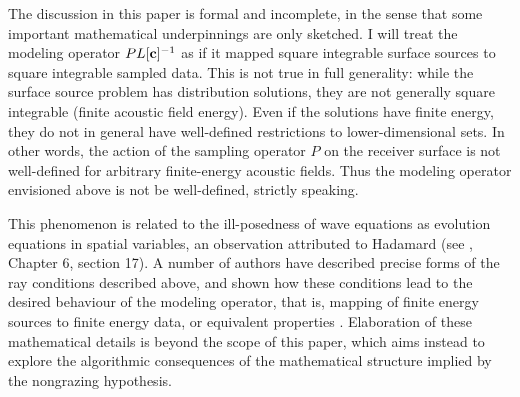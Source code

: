 \documentclass[georeport,12pt]{geophysics}
\begin{document}
The discussion in this paper is formal and incomplete, in the sense
that some important mathematical underpinnings are only
sketched. I will treat the modeling operator $PL[{\bf c}]^{-1}$ as if
it mapped square integrable surface sources to square integrable sampled
data. This is not true in full generality: while the surface source
problem has distribution solutions, they are not generally square
integrable (finite acoustic field energy). Even if the solutions have
finite energy, they do not in general have well-defined
restrictions to lower-dimensional sets. In other words, the action of
the sampling
operator $P$ on the receiver surface is not well-defined for arbitrary
finite-energy acoustic fields. Thus the modeling operator envisioned above
is not be well-defined, strictly speaking.

This phenomenon is related to the ill-posedness of wave equations as
evolution equations in spatial variables, an observation attributed to
Hadamard (see \cite{CourHil:62}, Chapter 6, section 17). A number of
authors have described precise forms of the ray conditions described
above, and shown how these conditions lead to the desired behaviour of
the modeling operator, that is, mapping of finite energy sources to
finite energy data, or equivalent properties
\cite{Payn:75,Symes:83,Lasi:86,LasLionsTrig:86,Lasi:87, BaoSy:91b}.
Elaboration of these mathematical details is beyond the scope of this
paper, which aims instead to explore the algorithmic consequences of
the mathematical structure implied by the nongrazing hypothesis.


\end{document}
